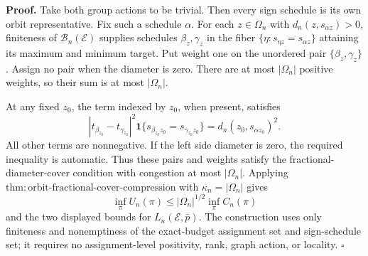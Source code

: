 \textbf{Proof.}
Take both group actions to be trivial. Then every sign schedule is its own orbit representative. Fix such a schedule \(\alpha\). For each \(z\in\Omega_n\) with \(d_n(z,s_{\alpha z})>0\), finiteness of \(\mathcal B_n(\mathcal E)\) supplies schedules \(\beta_z,\gamma_z\) in the fiber \(\{\eta:s_{\eta z}=s_{\alpha z}\}\) attaining its maximum and minimum target. Put weight one on the unordered pair \(\{\beta_z,\gamma_z\}\). Assign no pair when the diameter is zero. There are at most \(|\Omega_n|\) positive weights, so their sum is at most \(|\Omega_n|\).

At any fixed \(z_0\), the term indexed by \(z_0\), when present, satisfies
\[
 |t_{\beta_{z_0}}-t_{\gamma_{z_0}}|^2
 \mathbf 1\{s_{\beta_{z_0}z_0}=s_{\gamma_{z_0}z_0}\}
 =d_n(z_0,s_{\alpha z_0})^2. \tag{1}
\]
All other terms are nonnegative. If the left side diameter is zero, the required inequality is automatic. Thus these pairs and weights satisfy the fractional-diameter-cover condition with congestion at most \(|\Omega_n|\). Applying \(\mathrm{thm{:}orbit\text{-}fractional\text{-}cover\text{-}compression}\) with \(\kappa_n=|\Omega_n|\) gives
\[
 \inf_\pi U_n(\pi)
 \le |\Omega_n|^{1/2}\inf_\pi C_n(\pi)
\]
and the two displayed bounds for \(L_n(\mathcal E,\bar p)\). The construction uses only finiteness and nonemptiness of the exact-budget assignment set and sign-schedule set; it requires no assignment-level positivity, rank, graph action, or locality. \(\square\)
